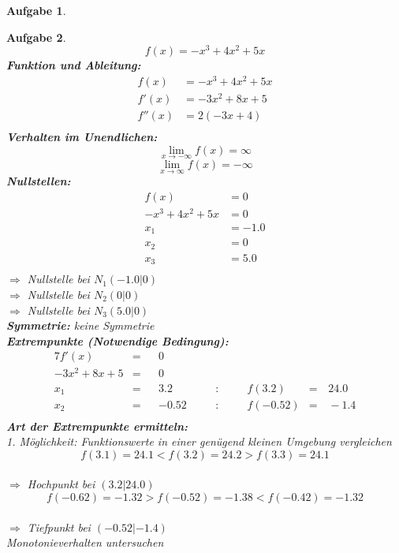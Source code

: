 \documentclass[12pt]{article}
\theoremstyle{note}
\newtheorem{aufgabe}{Aufgabe}
\begin{document}
\begin{flushleft}
\begin{aufgabe}
\end{aufgabe}\clearpage\begin{aufgabe} ~  
$$f(x)=- x^{3} + 4 x^{2} + 5 x$$ 
{\bf Funktion und Ableitung:} 
\begin{align*} 
f(x)&=- x^{3} + 4 x^{2} + 5 x\\ 
f'(x)&=- 3 x^{2} + 8 x + 5\\ 
f''(x)&=2 \left(- 3 x + 4\right)\\ 
\end{align*} 
{\bf Verhalten im Unendlichen:} 
\[ \lim_{x\rightarrow -\infty} f(x) =\infty\]\[ \lim_{x\rightarrow\infty} f(x) =-\infty\]{\bf Nullstellen:} 
\begin{align*} 
f(x)&=0 \\ 
- x^{3} + 4 x^{2} + 5 x&=0 \\ 
x_1&=-1.0\\ 
x_2&=0\\ 
x_3&=5.0\\ 
\end{align*} 
$\Rightarrow$ Nullstelle bei $N_1(-1.0|0)$ \\ 
$\Rightarrow$ Nullstelle bei $N_2(0|0)$ \\ 
$\Rightarrow$ Nullstelle bei $N_3(5.0|0)$ \\ 
{\bf Symmetrie:} 
keine Symmetrie \\ 
{\bf Extrempunkte (Notwendige Bedingung):} 
\begin{alignat*}{7} 
f'(x)&=& &0& \\ 
- 3 x^{2} + 8 x + 5&=& &0& \\ 
x_1&=& &3.2& \quad &:& \quad &f(3.2)&=& \,24.0\\ 
x_2&=& &-0.52& \quad &:& \quad &f(-0.52)&=& \,-1.4\\ 
\end{alignat*} 
{\bf Art der Extrempunkte ermitteln:} \\[1em] 
{\em 1. M\"oglichkeit:} Funktionswerte in einer gen\"ugend kleinen Umgebung vergleichen \\ 
$$f(3.1)=24.1  <  f(3.2)=24.2  >  f(3.3)=24.1$$\\ 
$\Rightarrow$ Hochpunkt bei $(3.2|24.0)$ \\ 
\vspace{1em}$$f(-0.62)=-1.32  >  f(-0.52)=-1.38  <   f(-0.42)=-1.32$$\\ 
$\Rightarrow$ Tiefpunkt bei $(-0.52|-1.4)$ \\ 
\vspace{1em}{\em 2. M\"oglichkeit:} Monotonieverhalten untersuchen \\ 

\end{aufgabe}
\end{flushleft}
\end{document}
